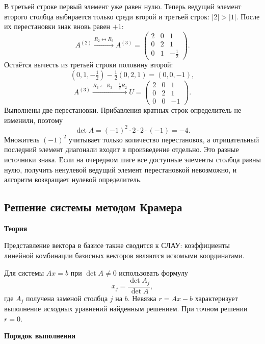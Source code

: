 \documentclass[12pt,a4paper]{article}
\newcommand{\micro}[1]{\subsection{#1}}
\newcommand{\taskhead}[1]{\par\textbf{#1}\par}
\begin{document}
В третьей строке первый элемент уже равен нулю. Теперь ведущий элемент
второго столбца выбирается только среди второй и третьей строк:
$|2|>|1|$. После их перестановки знак вновь равен $+1$:
\[
A^{(2)}\xrightarrow{R_2\leftrightarrow R_3}
A^{(3)}=\begin{pmatrix}2&0&1\\0&2&1\\0&1&-\frac12\end{pmatrix}.
\]
Остаётся вычесть из третьей строки половину второй:
\[
(0,1,-\tfrac12)-\tfrac12(0,2,1)=(0,0,-1),
\]
\[
A^{(3)}\xrightarrow{R_3\gets R_3-\frac12R_2}
U=\begin{pmatrix}2&0&1\\0&2&1\\0&0&-1\end{pmatrix}.
\]
Выполнены две перестановки. Прибавления кратных строк определитель не
изменили, поэтому
\[
\boxed{\det A=(-1)^2\cdot2\cdot2\cdot(-1)=-4}.
\]
Множитель $(-1)^2$ учитывает только количество перестановок, а отрицательный последний
элемент диагонали входит в произведение отдельно. Это разные источники знака.
Если на очередном шаге все доступные элементы столбца равны нулю,
получить ненулевой ведущий элемент перестановкой невозможно, и алгоритм
возвращает нулевой определитель.

\micro{Решение системы методом Крамера}
\taskhead{Теория}

Представление вектора в базисе также сводится к СЛАУ:
коэффициенты линейной комбинации базисных векторов являются искомыми
координатами.

Для системы $Ax=b$ при $\det A\ne0$ использовать формулу
\[
x_j=\frac{\det A_j}{\det A},
\]
где $A_j$ получена заменой столбца $j$ на $b$.
Невязка $r=Ax-b$ характеризует выполнение исходных уравнений найденным
решением. При точном решении $r=0$.

\taskhead{Порядок выполнения}
\end{document}
